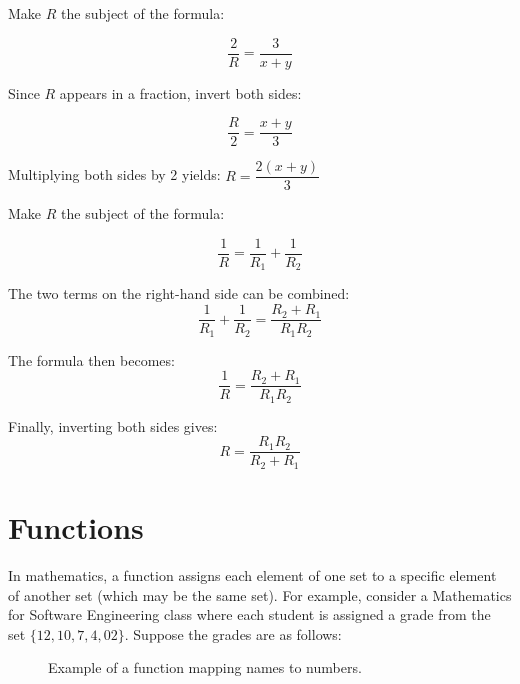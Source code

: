 \begin{example} Make \(R\) the subject of the formula:

\[
\frac{2}{R} = \frac{3}{x + y}
\]

\begin{solution} Since \(R\) appears in a fraction, invert both sides:

\[
\frac{R}{2} = \frac{x + y}{3}
\]

Multiplying both sides by 2 yields: $R = \dfrac{2(x + y)}{3}$    
\end{solution}
    
\end{example} 

\begin{example} Make \(R\) the subject of the formula:

\[
\frac{1}{R} = \frac{1}{R_1} + \frac{1}{R_2}
\]
\begin{solution}
The two terms on the right-hand side can be combined:
\[
\frac{1}{R_1} + \frac{1}{R_2} = \frac{R_2 + R_1}{R_1R_2}
\]

The formula then becomes:
\[
\frac{1}{R} = \frac{R_2 + R_1}{R_1R_2}
\]

Finally, inverting both sides gives:
\[
R = \frac{R_1R_2}{R_2 + R_1}
\]

\end{solution}
\end{example}

\section{Functions}
In mathematics, a function assigns each element of one set to a specific element of another set (which may be the same set). For example, consider a Mathematics for Software Engineering class where each student is assigned a grade from the set \(\{12, 10, 7, 4, 02\}\). Suppose the grades are as follows:

\begin{figure}[h]
    \centering
    \caption{Example of a function mapping names to numbers.}
    \label{fig:names_to_numbers}
\end{figure}


